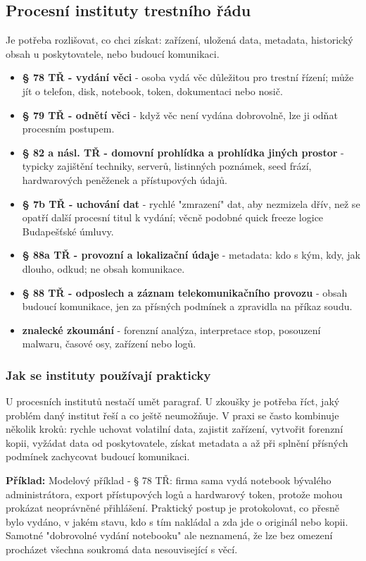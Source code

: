 \documentclass[11pt,a4paper]{article}
\newcommand{\priklad}[1]{\begin{tcolorbox}[breakable,enhanced,colback=green!7,colframe=green!30!black,boxrule=0pt,arc=1mm,left=5pt,right=5pt,top=5pt,bottom=5pt,before skip=6pt,after skip=6pt]\textbf{Příklad:} #1\end{tcolorbox}}
\begin{document}
\subsection*{Procesní instituty trestního řádu}
Je potřeba rozlišovat, co chci získat: zařízení, uložená data, metadata, historický obsah u poskytovatele, nebo budoucí komunikaci.
\begin{itemize}
  \item \textbf{§ 78 TŘ - vydání věci} - osoba vydá věc důležitou pro trestní řízení; může jít o telefon, disk, notebook, token, dokumentaci nebo nosič.
  \item \textbf{§ 79 TŘ - odnětí věci} - když věc není vydána dobrovolně, lze ji odňat procesním postupem.
  \item \textbf{§ 82 a násl. TŘ - domovní prohlídka a prohlídka jiných prostor} - typicky zajištění techniky, serverů, listinných poznámek, seed frází, hardwarových peněženek a přístupových údajů.
  \item \textbf{§ 7b TŘ - uchování dat} - rychlé "zmrazení" dat, aby nezmizela dřív, než se opatří další procesní titul k vydání; věcně podobné quick freeze logice Budapešťské úmluvy.
  \item \textbf{§ 88a TŘ - provozní a lokalizační údaje} - metadata: kdo s kým, kdy, jak dlouho, odkud; ne obsah komunikace.
  \item \textbf{§ 88 TŘ - odposlech a záznam telekomunikačního provozu} - obsah budoucí komunikace, jen za přísných podmínek a zpravidla na příkaz soudu.
  \item \textbf{znalecké zkoumání} - forenzní analýza, interpretace stop, posouzení malwaru, časové osy, zařízení nebo logů.
\end{itemize}

\subsubsection*{Jak se instituty používají prakticky}
U procesních institutů nestačí umět paragraf. U zkoušky je potřeba říct, jaký problém daný institut řeší a co ještě neumožňuje. V praxi se často kombinuje několik kroků: rychle uchovat volatilní data, zajistit zařízení, vytvořit forenzní kopii, vyžádat data od poskytovatele, získat metadata a až při splnění přísných podmínek zachycovat budoucí komunikaci.

\priklad{Modelový příklad - § 78 TŘ: firma sama vydá notebook bývalého administrátora, export přístupových logů a hardwarový token, protože mohou prokázat neoprávněné přihlášení. Praktický postup je protokolovat, co přesně bylo vydáno, v jakém stavu, kdo s tím nakládal a zda jde o originál nebo kopii. Samotné "dobrovolné vydání notebooku" ale neznamená, že lze bez omezení procházet všechna soukromá data nesouvisející s věcí.}
\end{document}
